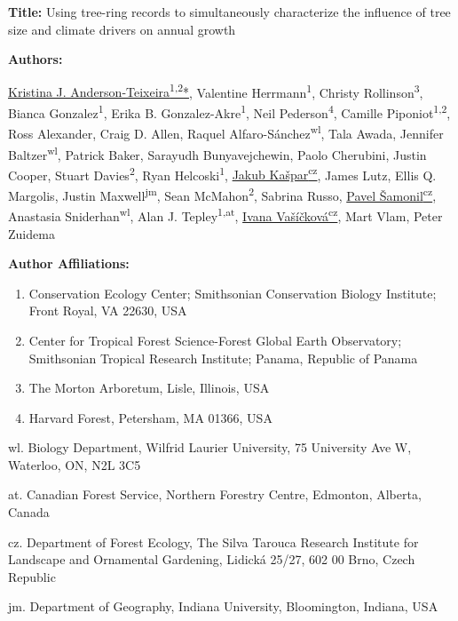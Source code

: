 \documentclass[
]{article}
\author{}
\date{\vspace{-2.5em}}
\begin{document}
\raggedright

\textbf{Title:} Using tree-ring records to simultaneously characterize
the influence of tree size and climate drivers on annual growth

\textbf{Authors:}

\href{0000-0001-8461-9713}{Kristina J.
Anderson-Teixeira\textsuperscript{1,2}*}, Valentine
Herrmann\textsuperscript{1}, Christy Rollinson\textsuperscript{3},
Bianca Gonzalez\textsuperscript{1}, Erika B.
Gonzalez-Akre\textsuperscript{1}, Neil Pederson\textsuperscript{4},
Camille Piponiot\textsuperscript{1,2}, Ross Alexander, Craig D. Allen,
Raquel Alfaro-Sánchez\textsuperscript{wl}, Tala Awada, Jennifer
Baltzer\textsuperscript{wl}, Patrick Baker, Sarayudh Bunyavejchewin,
Paolo Cherubini, Justin Cooper, Stuart Davies\textsuperscript{2}, Ryan
Helcoski\textsuperscript{1}, \href{0000-0003-1780-6310}{Jakub
Kašpar\textsuperscript{cz}}, James Lutz, Ellis Q. Margolis, Justin
Maxwell\textsuperscript{jm}, Sean McMahon\textsuperscript{2}, Sabrina
Russo, \href{0000-0002-7722-8797}{Pavel Šamonil\textsuperscript{cz}},
Anastasia Sniderhan\textsuperscript{wl}, Alan J.
Tepley\textsuperscript{1,at}, \href{0000-0002-6070-5956}{Ivana
Vašíčková\textsuperscript{cz}}, Mart Vlam, Peter Zuidema

\textbf{Author Affiliations:}

\begin{enumerate}
\def\labelenumi{\arabic{enumi}.}
\item
  Conservation Ecology Center; Smithsonian Conservation Biology
  Institute; Front Royal, VA 22630, USA
\item
  Center for Tropical Forest Science-Forest Global Earth Observatory;
  Smithsonian Tropical Research Institute; Panama, Republic of Panama
\item
  The Morton Arboretum, Lisle, Illinois, USA
\item
  Harvard Forest, Petersham, MA 01366, USA
\end{enumerate}

wl. Biology Department, Wilfrid Laurier University, 75 University Ave W,
Waterloo, ON, N2L 3C5

at. Canadian Forest Service, Northern Forestry Centre, Edmonton,
Alberta, Canada

cz. Department of Forest Ecology, The Silva Tarouca Research Institute
for Landscape and Ornamental Gardening, Lidická 25/27, 602 00 Brno,
Czech Republic

jm. Department of Geography, Indiana University, Bloomington, Indiana,
USA
\end{document}
